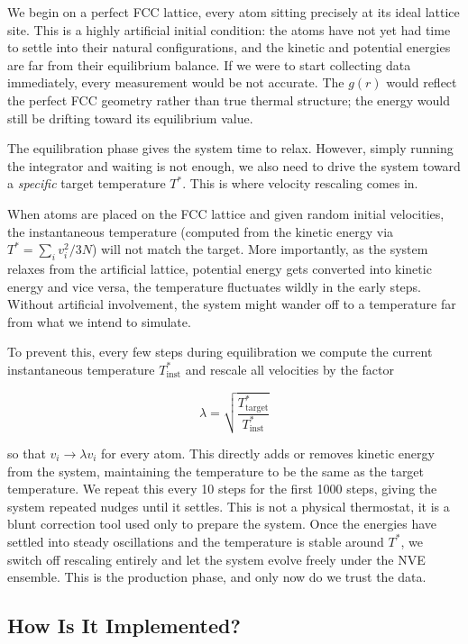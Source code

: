 We begin on a perfect FCC lattice, every atom sitting precisely at its ideal 
lattice site. This is a highly artificial initial condition: the atoms have not 
yet had time to settle into their natural configurations, and the kinetic and 
potential energies are far from their equilibrium balance. If we were to start 
collecting data immediately, every measurement would be not accurate. The $g(r)$ would reflect the perfect FCC geometry rather than true 
thermal structure; the energy would still be drifting toward its equilibrium 
value.

The equilibration phase gives the system time to relax. However, simply running 
the integrator and waiting is not enough, we also need to drive the system 
toward a \textit{specific} target temperature $T^*$. This is where velocity 
rescaling comes in.

When atoms are placed on the FCC lattice and given random initial velocities, 
the instantaneous temperature (computed from the kinetic energy via 
$T^* = \sum_i v_i^2 / 3N$) will not match the target. More 
importantly, as the system relaxes from the artificial lattice, potential energy 
gets converted into kinetic energy and vice versa, the temperature fluctuates 
wildly in the early steps. Without artificial involvement, the system might wander off to 
a temperature far from what we intend to simulate.

To prevent this, every few steps during equilibration we compute the current 
instantaneous temperature $T^*_{\mathrm{inst}}$ and rescale all velocities by 
the factor

\begin{equation}
    \lambda = \sqrt{\frac{T^*_{\mathrm{target}}}{T^*_{\mathrm{inst}}}}
\end{equation}

so that $v_i \to \lambda v_i$ for every atom. This directly adds or removes 
kinetic energy from the system, maintaining the temperature to be the same as the target temperature. 
We repeat this every 10 steps for the first 1000 steps, giving the system 
repeated nudges until it settles. This is not a physical thermostat, it is a 
blunt correction tool used only to prepare the system. Once the energies have 
settled into steady oscillations and the temperature is stable around $T^*$, we 
switch off rescaling entirely and let the system evolve freely under the NVE 
ensemble. This is the production phase, and only now do we trust the data.

\subsection{How Is It Implemented?}

